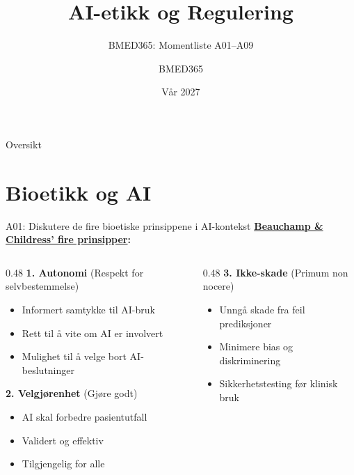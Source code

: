 \documentclass[aspectratio=169, 10pt]{beamer}
\title{AI-etikk og Regulering}
\subtitle{BMED365: Momentliste A01--A09}
\author{BMED365}
\date{Vår 2027}
\begin{document}
\begin{frame}
    \titlepage
\end{frame}

\begin{frame}{Oversikt}
    \tableofcontents
\end{frame}

\section{Bioetikk og AI}

\begin{frame}{A01: Diskutere de fire bioetiske prinsippene i AI-kontekst}
    \textbf{\href{https://en.wikipedia.org/wiki/Principlism}{Beauchamp \& Childress' fire prinsipper}:}
    
    \vspace{0.3cm}
    \begin{columns}[T]
        \begin{column}{0.48\textwidth}
            \textbf{1. Autonomi} (Respekt for selvbestemmelse)
            \begin{itemize}
                \item Informert samtykke til AI-bruk
                \item Rett til å vite om AI er involvert
                \item Mulighet til å velge bort AI-beslutninger
            \end{itemize}
            
            \vspace{0.3cm}
            \textbf{2. Velgjørenhet} (Gjøre godt)
            \begin{itemize}
                \item AI skal forbedre pasientutfall
                \item Validert og effektiv
                \item Tilgjengelig for alle
            \end{itemize}
        \end{column}
        \begin{column}{0.48\textwidth}
            \textbf{3. Ikke-skade} (Primum non nocere)
            \begin{itemize}
                \item Unngå skade fra feil prediksjoner
                \item Minimere bias og diskriminering
                \item Sikkerhetstesting før klinisk bruk
            \end{itemize}
            

\end{column}
\end{columns}
\end{frame}
\end{document}
